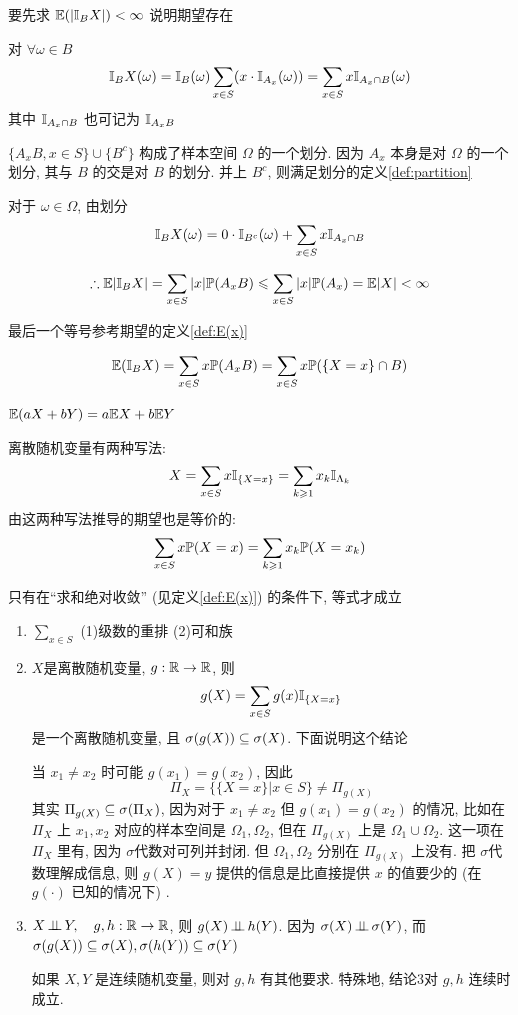 \begin{solution*}
要先求 $\mathbb E(|\mathbb I_B X|)<\infty$ 说明期望存在

对 $\forall \omega\in B$
\[
\mathbb I_B X(\omega)
=\mathbb I_B(\omega)\sum_{x\in S}(x\cdot \mathbb I_{A_x}(\omega))
=\sum_{x\in S}x\mathbb I_{A_x\cap B}(\omega)
\]
其中 $\mathbb I_{A_x\cap B}$ 也可记为 $\mathbb I_{A_x B}$

$\{A_x B,x\in S\}\cup \{B^c\}$ 构成了样本空间 $\Omega$ 的一个划分. 因为 $A_x$ 本身是对 $\Omega$ 的一个划分, 其与 $B$ 的交是对 $B$ 的划分. 并上 $B^c$, 则满足划分的定义\ref{def:partition}

对于 $\omega\in \Omega$, 由划分
\[
\mathbb I_B X(\omega)=0\cdot \mathbb I_{B^c}(\omega)+\sum_{x\in S}x\mathbb I_{A_x\cap B}
\]

\[
\therefore \mathbb E |\mathbb I_B X|=\sum_{x\in S}|x|\mathbb{P}(A_x B)\leqslant \sum_{x\in S}|x|\mathbb{P}(A_x)=\mathbb E|X|<\infty
\]

最后一个等号参考期望的定义\ref{def:E(x)}

\[
\mathbb E (\mathbb I_B X)=\sum_{x\in S}x \mathbb{P}(A_x B)=\sum_{x\in S}x \mathbb{P}(\{X=x\}\cap B)
\]
\end{solution*}

\begin{theorem}
    $\mathbb E(aX+bY)=a\mathbb E X+b\mathbb E Y$
\end{theorem}

离散随机变量有两种写法:
\[
X=\sum_{x\in S}x\mathbb I_{\{X=x\}}=\sum_{k\geqslant 1}x_k\mathbb I_{\Lambda_k}
\]
由这两种写法推导的期望也是等价的:
\[
\sum_{x\in S}x\mathbb{P}(X=x)=\sum_{k\geqslant 1}x_k\mathbb{P}(X=x_k)
\]

只有在“求和绝对收敛” (见定义\ref{def:E(x)}) 的条件下, 等式才成立

\begin{remark}
    \quad 

    \begin{enumerate}
        \item $\sum_{x\in S}$ (1)级数的重排 (2)可和族
        \item $X$是离散随机变量, $g:\mathbb{R}\rightarrow\mathbb{R}$, 则 
        \[
        g(X)=\sum_{x\in S}g(x)\mathbb I_{\{X=x\}}
        \]
        是一个离散随机变量, 且 $\sigma(g(X))\subseteq \sigma(X)$. 下面说明这个结论

        当 $x_1\neq x_2$ 时可能 $g(x_1)=g(x_2)$, 因此
        \[
        \Pi_X=\{\{X=x\}|x\in S\}\neq \Pi_{g(X)}
        \]
        其实 $\Pi_{g(X)}\subseteq \sigma(\Pi_X)$, 因为对于 $x_1\neq x_2$ 但 $g(x_1)=g(x_2)$ 的情况, 比如在 $\Pi_X$ 上 $x_1,x_2$ 对应的样本空间是 $\Omega_1,\Omega_2$, 但在 $\Pi_{g(X)}$ 上是 $\Omega_1\cup \Omega_2$. 这一项在 $\Pi_X$ 里有, 因为 $\sigma$代数对可列并封闭. 但 $\Omega_1,\Omega_2$ 分别在 $\Pi_{g(X)}$ 上没有. 把 $\sigma$代数理解成信息, 则 $g(X)=y$ 提供的信息是比直接提供 $x$ 的值要少的 (在 $g(\cdot)$ 已知的情况下) . 

        \item $X\operatorname{\perp\!\!\!\perp} Y,\quad g, h:\mathbb{R}\rightarrow \mathbb{R}$, 则 $g(X)\operatorname{\perp\!\!\!\perp} h(Y)$. 因为 $\sigma(X)\operatorname{\perp\!\!\!\perp} \sigma(Y)$, 而 $\sigma(g(X))\subseteq \sigma(X), \sigma(h(Y))\subseteq \sigma(Y)$
        
        如果 $X,Y$ 是连续随机变量, 则对 $g,h$ 有其他要求. 特殊地, 结论3对 $g,h$ 连续时成立. 
    \end{enumerate}
\end{remark}

